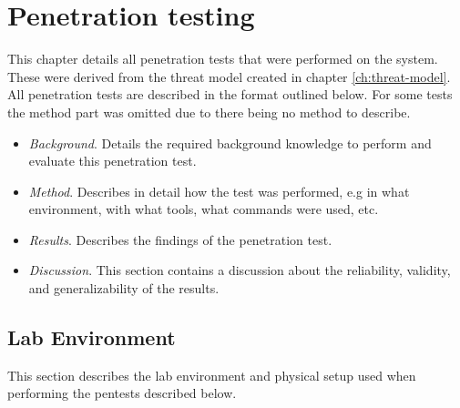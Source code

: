 \chapter{Penetration testing} \label{ch:pentesting}
This chapter details all penetration tests that were performed on the system. These were derived from the threat model created in chapter \ref{ch:threat-model}. All penetration tests are described in the format outlined below. For some tests the method part was omitted due to there being no method to describe.
\begin{itemize}
    \item \textit{Background}. Details the required background knowledge to perform and evaluate this penetration test.
    \item \textit{Method}. Describes in detail how the test was performed, e.g in what environment, with what tools, what commands were used, etc.
    \item \textit{Results}. Describes the findings of the penetration test.
    \item \textit{Discussion}. This section contains a discussion about the reliability, validity, and generalizability of the results.
\end{itemize}

\section{Lab Environment} \label{ch:pentesting:lab-setup}
This section describes the lab environment and physical setup used when performing the pentests described below.

